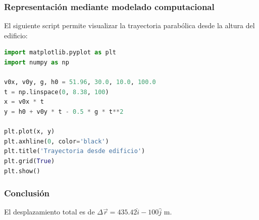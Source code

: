 \documentclass[12pt, a4paper]{article}
\begin{document}
\subsubsection*{Representación mediante modelado computacional}
El siguiente script permite visualizar la trayectoria parabólica desde la altura del edificio:
\begin{lstlisting}[language=Python]
import matplotlib.pyplot as plt
import numpy as np

v0x, v0y, g, h0 = 51.96, 30.0, 10.0, 100.0
t = np.linspace(0, 8.38, 100)
x = v0x * t
y = h0 + v0y * t - 0.5 * g * t**2

plt.plot(x, y)
plt.axhline(0, color='black')
plt.title('Trayectoria desde edificio')
plt.grid(True)
plt.show()
\end{lstlisting}

\subsubsection*{Conclusión}
El desplazamiento total es de $\Delta\vec{r} = 435.42\hat{i} - 100\hat{j} \text{ m}$.
\end{document}
